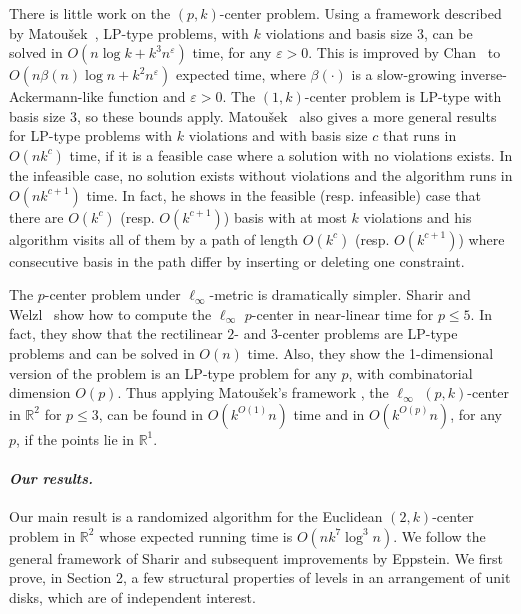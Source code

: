 \documentclass[11pt]{myclass}
\newcommand{\eps}{\varepsilon}
\renewcommand{\b}[1]{\ensuremath{\mathbb{#1}}}
\begin{document}
There is little work on the $(p,k)$-center problem.
Using a framework described by Matou\v{s}ek~\cite{Mat95}, LP-type problems, with $k$ violations and basis size $3$, can be solved in $O(n \log k + k^3 n^\eps)$ time, for any $\eps > 0$.  This is improved by Chan~\cite{Cha05} to $O(n \beta(n) \log n + k^2 n^{\eps})$ expected time, where $\beta(\cdot)$ is a slow-growing inverse-Ackermann-like function and $\eps>0$.  
The $(1,k)$-center problem is LP-type with basis size $3$, so these bounds apply.  
Matou\v{s}ek~\cite{Mat95} also gives a more general results for LP-type problems with $k$ violations and with basis size $c$ that runs in $O(n k^c)$ time, if it is a feasible case where a solution with no violations exists.  In the infeasible case, no solution exists without violations and the algorithm runs in $O(n k^{c+1})$ time.  In fact, he shows in the feasible (resp. infeasible) case that there are $O(k^c)$ (resp. $O(k^{c+1})$) basis with at most $k$ violations and his algorithm visits all of them by a path of length $O(k^c)$ (resp. $O(k^{c+1})$) where consecutive basis in the path differ by inserting or deleting one constraint.  


The $p$-center problem under $\ell_\infty$-metric is dramatically simpler.  
Sharir and Welzl~\cite{SW96} show how to compute the $\ell_\infty$ $p$-center in near-linear time for $p \leq 5$.  In fact, they show that the rectilinear $2$- and $3$-center problems are LP-type problems and can be solved in $O(n)$ time.  Also, they show the 1-dimensional version of the problem is an LP-type problem for any $p$, with combinatorial dimension $O(p)$.  Thus applying Matou\v{s}ek's framework \cite{Mat95}, the $\ell_\infty$ $(p,k)$-center in $\b{R}^2$ for $p \leq 3$, can be found in $O(k^{O(1)} n)$ time and in $O(k^{O(p)} n)$, for any $p$, if the points lie in $\b{R}^1$.  



\paragraph{\textbf{\emph{Our results.}}}
Our main result is a randomized algorithm for the Euclidean $(2,k)$-center problem in $\b{R}^2$ whose expected running time is $O(nk^7 \log^3 n)$.  
We follow the general framework of Sharir and subsequent improvements by Eppstein.  
We first prove, in Section 2, a few  structural properties of levels in an arrangement of unit disks, which are of independent interest.  
\end{document}
